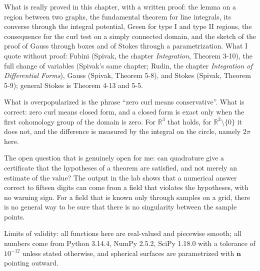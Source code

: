 \begin{untukpeneliti}
What is really proved in this chapter, with a written proof: the lemma on a region
between two graphs, the fundamental theorem for line integrals, its converse through the integral
potential, Green for type I and type II regions, the consequence for the curl test on a
simply connected domain, and the sketch of the proof of Gauss through boxes and of Stokes
through a parametrization. What I quote without proof: Fubini (Spivak, the chapter
\emph{Integration}, Theorem 3-10), the full change of variables (Spivak's same
chapter; Rudin, the chapter \emph{Integration of Differential Forms}), Gauss (Spivak,
Theorem 5-8), and Stokes (Spivak, Theorem 5-9); general Stokes is Theorem
4-13 and 5-5.

What is overpopularized is the phrase ``zero curl means
conservative''. What is correct: zero curl means closed form, and a closed form is
exact only when the first cohomology group of the domain is zero. For $\mathbb{R}^{3}$
that holds, for $\mathbb{R}^{2}\setminus\{0\}$ it does not, and the difference is
measured by the integral on the circle, namely $2\pi$ here.

The open question that is genuinely open for me: can quadrature give
a certificate that the hypotheses of a theorem are satisfied, and not merely an estimate of the value?
The output in the lab shows that a numerical answer correct to fifteen
digits can come from a field that violates the hypotheses, with no warning sign. For
a field that is known only through samples on a grid, there is no general way
to be sure that there is no singularity between the sample points.

Limits of validity: all functions here are real-valued and piecewise
smooth; all numbers come from Python 3.14.4, NumPy 2.5.2, SciPy 1.18.0
with a tolerance of $10^{-12}$ unless stated otherwise, and spherical surfaces
are parametrized with $\mathbf{n}$ pointing outward.
\end{untukpeneliti}

